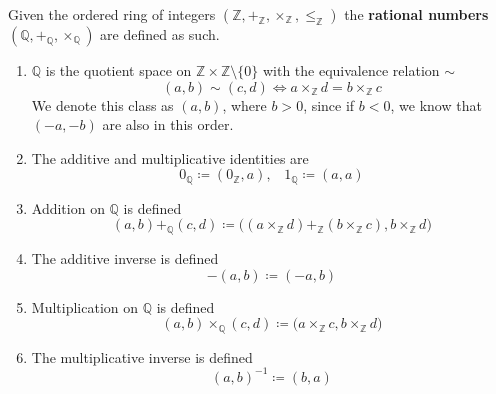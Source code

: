     \begin{definition}[Rationals]
      Given the ordered ring of integers $(\mathbb{Z}, +_{\mathbb{Z}}, \times_{\mathbb{Z}}, \leq_{\mathbb{Z}})$ the \textbf{rational numbers} $(\mathbb{Q}, +_{\mathbb{Q}}, \times_{\mathbb{Q}})$ are defined as such. 
      \begin{enumerate}
        \item $\mathbb{Q}$ is the quotient space on $\mathbb{Z} \times \mathbb{Z} \setminus \{0\}$ with the equivalence relation $\sim$ 
        \begin{equation}
          (a, b) \sim (c, d) \iff a \times_{\mathbb{Z}} d = b \times_{\mathbb{Z}} c
        \end{equation} 
        We denote this class as $(a, b)$, where $b > 0$, since if $b < 0$, we know that $(-a, -b)$ are also in this order. 

        \item The additive and multiplicative identities are 
        \begin{equation}
          0_{\mathbb{Q}} \coloneqq (0_{\mathbb{Z}}, a), \;\;\; 1_{\mathbb{Q}} \coloneqq (a, a)
        \end{equation}

        \item Addition on $\mathbb{Q}$ is defined 
        \begin{equation}
          (a, b) +_{\mathbb{Q}} (c, d) \coloneqq \big( (a \times_{\mathbb{Z}} d) +_{\mathbb{Z}} (b \times_{\mathbb{Z}} c), b \times_{\mathbb{Z}} d \big) 
        \end{equation}

        \item The additive inverse is defined 
        \begin{equation}
          -(a, b) \coloneqq (-a, b)
        \end{equation}

        \item Multiplication on $\mathbb{Q}$ is defined 
        \begin{equation}
          (a, b) \times_{\mathbb{Q}} (c, d) \coloneqq \big( a \times_{\mathbb{Z}} c, b \times_{\mathbb{Z}} d \big)
        \end{equation} 

        \item The multiplicative inverse is defined 
        \begin{equation}
          (a, b)^{-1} \coloneqq (b, a)
        \end{equation}
      \end{enumerate}
    \end{definition}

